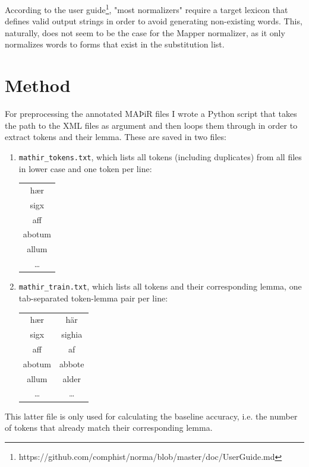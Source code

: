 \documentclass[11pt,a4paper]{article}
\begin{document}
According to the user guide\footnote{https://github.com/comphist/norma/blob/master/doc/UserGuide.md}, "most normalizers" require a target lexicon that defines valid output strings in order to avoid generating non-existing words. This, naturally, does not seem to be the case for the Mapper normalizer, as it only normalizes words to forms that exist in the substitution list. 

\section{Method}
For preprocessing the annotated MAÞiR files I wrote a Python script that takes the path to the XML files as argument and then loops them through in order to extract tokens and their lemma. These are saved in two files: 

\begin{enumerate}
   \item \texttt{mathir\_tokens.txt}, which lists all tokens (including duplicates) from all files in lower case and one token per line:
   \begin{table}[H]
    \centering
    \begin{tabular}{c}
       hær \\
       sigx \\
       aff \\
       abotum \\
       allum \\
       \ldots
    \end{tabular}
   \end{table}
    \item \texttt{mathir\_train.txt}, which lists all tokens and their corresponding lemma, one tab-separated token-lemma pair per line:
    
    \begin{table}[H]
    \centering
    \begin{tabular}{c|c}
        hær & här \\
        sigx & sighia \\
        aff & af \\
        abotum & abbote \\ 
        allum &	alder \\ 
        \ldots & \ldots
    \end{tabular}
    \end{table}
\end{enumerate}

This latter file is only used for calculating the baseline accuracy, i.e. the number of tokens that already match their corresponding lemma.
\end{document}
